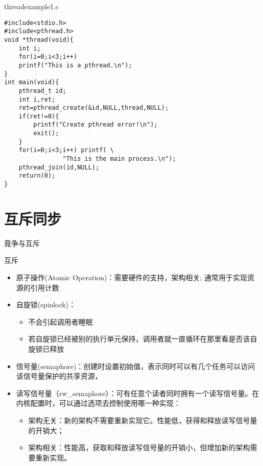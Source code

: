\begin{frame}[containsverbatim]{threadexample1.c}
\begin{lstlisting}
#include<stdio.h>  
#include<pthread.h>
void *thread(void){
	int i;
	for(i=0;i<3;i++)
	printf("This is a pthread.\n");
}
int main(void){
	pthread_t id;
	int i,ret;
	ret=pthread_create(&id,NULL,thread,NULL);
	if(ret!=0){
		printf("Create pthread error!\n");
		exit();
	}
	for(i=0;i<3;i++) printf( \
                "This is the main process.\n");
	pthread_join(id,NULL);
	return(0);
}
\end{lstlisting}
\end{frame}


\section{互斥同步}


\begin{frame}{竟争与互斥}
\begin{center}\end{center}
\end{frame}

\begin{frame}{互斥}
     \begin{itemize}
     \item 原子操作(Atomic Operation)：需要硬件的支持，架构相关; 通常用于实现资源的引用计数
     \item 自旋锁(spinlock)：
           \begin{itemize}
           \item 不会引起调用者睡眠
           \item 若自旋锁已经被别的执行单元保持，调用者就一直循环在那里看是否该自旋锁已释放
           \end{itemize}
     \item 信号量(semaphore)：创建时设置初始值，表示同时可以有几个任务可以访问该信号量保护的共享资源，
     \item 读写信号量（rw\_semaphore）：可有任意个读者同时拥有一个读写信号量。在内核配置时，可以通过选项去控制使用哪一种实现：
           \begin{itemize}
           \item 架构无关：新的架构不需要重新实现它。性能低，获得和释放读写信号量的开销大；
           \item 架构相关：性能高，获取和释放读写信号量的开销小，但增加新的架构需要重新实现。
           \end{itemize}
     \end{itemize}
\end{frame}


